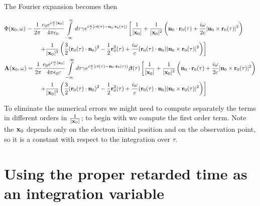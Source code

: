 The Fourier expansion becomes then
\begin{tcolorbox}[colback=blue!5!white,colframe=blue!75!black]
    \begin{align}
         & \Phi({\bf x}_0,\omega)=\frac1{2\pi}\frac{e_0 e^{i\frac{\omega}c|{\bf x}_0|}}{4\pi\epsilon_0}\int\limits_{-\infty}^{\infty}d\tau \gamma e^{i\frac{\omega}c\left[ct(\tau)-{\bf n}_0\cdot{\bf r}_0(\tau)\right)}                                     \left[\frac1{|{\bf x}_0|} +\frac1{|{\bf x}_0|^2}\left({{\bf n}_0\cdot{\bf r}_0(\tau)}+\frac{i\omega}{2c}{|{\bf n}_0\times{\bf r}_0(\tau)|^2} \right)       \right.\nonumber \\
         & \qquad \qquad \qquad \left.+\frac1{|{\bf x}_0|^3}\left(\frac32({\bf r}_0(\tau)
        \cdot{\bf n}_0)^2-\frac12{\bf r}^2_0(\tau)+\frac{i\omega}c({\bf r}_0(\tau)
        \cdot{\bf n}_0) |{\bf n}_0\times{\bf r}_0(\tau)|^2\right)     \right]                                                                                                                                                                                                                                                                                                                                                            \\
         & {\bf A}({\bf x}_0,\omega)=\frac1{2\pi}\frac{e_0 e^{i\frac{\omega}c|{\bf x}_0|}}{4\pi\epsilon_0 c}\int\limits_{-\infty}^{\infty}d\tau \gamma e^{i\frac{\omega}c\left[ct(\tau)-{\bf n}_0\cdot{\bf r}_0(\tau)\right)} {\boldsymbol{\beta}}(\tau) \left[\frac1{|{\bf x}_0|} +\frac1{|{\bf x}_0|^2}\left({{\bf n}_0\cdot{\bf r}_0(\tau)}+\frac{i\omega}{2c}{|{\bf n}_0\times{\bf r}_0(\tau)|^2} \right)       \right.\nonumber     \\
         & \qquad \qquad \qquad \left.+\frac1{|{\bf x}_0|^3}\left(\frac32({\bf r}_0(\tau)
        \cdot{\bf n}_0)^2-\frac12{\bf r}^2_0(\tau)+\frac{i\omega}c({\bf r}_0(\tau)
        \cdot{\bf n}_0) |{\bf n}_0\times{\bf r}_0(\tau)|^2\right)     \right]
    \end{align}
\end{tcolorbox}
To eliminate the numerical errors we might need to compute separately the terms in different orders in $\frac1{|{\bf x}_0|}$; to begin with we compute the first order term. Note the ${\bf x}_0$ depends only on the electron initial position and on the observation point, so it is a constant with respect to the integration over $\tau$.


\section{Using the proper retarded time as an integration variable}



